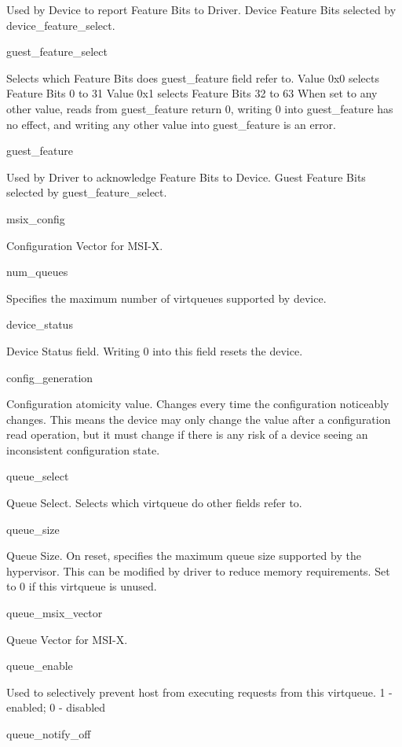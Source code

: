         Used by Device to report Feature Bits to Driver.
        Device Feature Bits selected by device_feature_select.

guest_feature_select

        Selects which Feature Bits does guest_feature field refer to.
        Value 0x0 selects Feature Bits 0 to 31
        Value 0x1 selects Feature Bits 32 to 63
        When set to any other value, reads from guest_feature
        return 0, writing 0 into guest_feature has no effect, and
        writing any other value into guest_feature is an error.

guest_feature

        Used by Driver to acknowledge Feature Bits to Device.
        Guest Feature Bits selected by guest_feature_select.

msix_config

        Configuration Vector for MSI-X.

num_queues

        Specifies the maximum number of virtqueues supported by device.

device_status

        Device Status field. Writing 0 into this field resets the
        device.

config_generation

        Configuration atomicity value.  Changes every time the
        configuration noticeably changes.  This means the device may
        only change the value after a configuration read operation,
        but it must change if there is any risk of a device seeing an
        inconsistent configuration state.

queue_select

        Queue Select. Selects which virtqueue do other fields refer to.

queue_size

        Queue Size.  On reset, specifies the maximum queue size supported by
        the hypervisor. This can be modified by driver to reduce memory requirements.
        Set to 0 if this virtqueue is unused.

queue_msix_vector

        Queue Vector for MSI-X.

queue_enable

        Used to selectively prevent host from executing requests from this virtqueue.
        1 - enabled; 0 - disabled

queue_notify_off


